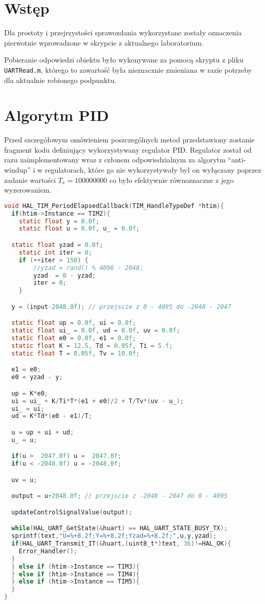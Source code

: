 \chapter{Wstęp}
Dla prostoty i przejrzystości sprawozdania wykorzystane zostały oznaczenia pierwotnie wprowadzone w skrypcie z aktualnego laboratorium\@.

Pobieranie odpowiedzi obiektu było wykonywane za pomocą skryptu z pliku \verb|UARTRead.m|, którego to zawartość była nieznacznie zmieniana w razie potrzeby dla aktualnie robionego podpunktu.

\chapter{Algorytm PID}
Przed szczegółowym omówieniem poszczególnych metod przedstawiony zostanie fragment kodu definiujący wykorzystywany regulator PID. Regulator został od razu zaimplementowany wraz z członem odpowiedzialnym za algorytm ``anti-windup'' i w regulatorach, które go nie wykorzystywały był on wyłączany poprzez zadanie wartości $T_\mathrm{v}=100000000$ co było efektywnie równoznaczne z jego wyzerowaniem.

\begin{lstlisting}[language=C]
void HAL_TIM_PeriodElapsedCallback(TIM_HandleTypeDef *htim){
  if(htim->Instance == TIM2){
  	static float y = 0.0f;
  	static float u = 0.0f, u_ = 0.0f;

  static float yzad = 0.0f;
  	static int iter = 0;
  	if (++iter > 150) {
  		//yzad = rand() % 4096 - 2048;
  		yzad  = 0 - yzad;
  		iter = 0;
  	}

  y = (input-2048.0f); // przejscie z 0 - 4095 do -2048 - 2047

  static float up = 0.0f, ui = 0.0f;
  static float ui_ = 0.0f, ud = 0.0f, uv = 0.0f;
  static float e0 = 0.0f, e1 = 0.0f;
  static float K = 12.5, Td = 0.05f, Ti = 5.f;
  static float T = 0.05f, Tv = 10.0f;

  e1 = e0;
  e0 = yzad - y;

  up = K*e0;
  ui = ui_ + K/Ti*T*(e1 + e0)/2 + T/Tv*(uv - u_);
  ui_ = ui;
  ud = K*Td*(e0 - e1)/T;

  u = up + ui + ud;
  u_ = u;

  if(u >  2047.0f) u =  2047.0f;
  if(u < -2048.0f) u = -2048.0f;

  uv = u;

  output = u+2048.0f; // przejscie z -2048 - 2047 do 0 - 4095

  updateControlSignalValue(output);

  while(HAL_UART_GetState(&huart) == HAL_UART_STATE_BUSY_TX);
  sprintf(text,"U=%+8.2f;Y=%+8.2f;Yzad=%+8.2f;",u,y,yzad);
  if(HAL_UART_Transmit_IT(&huart,(uint8_t*)text, 36)!=HAL_OK){
  	Error_Handler();
  }
  } else if (htim->Instance == TIM3){
  } else if (htim->Instance == TIM4){
  } else if (htim->Instance == TIM5){
  }
}


\end{lstlisting}

